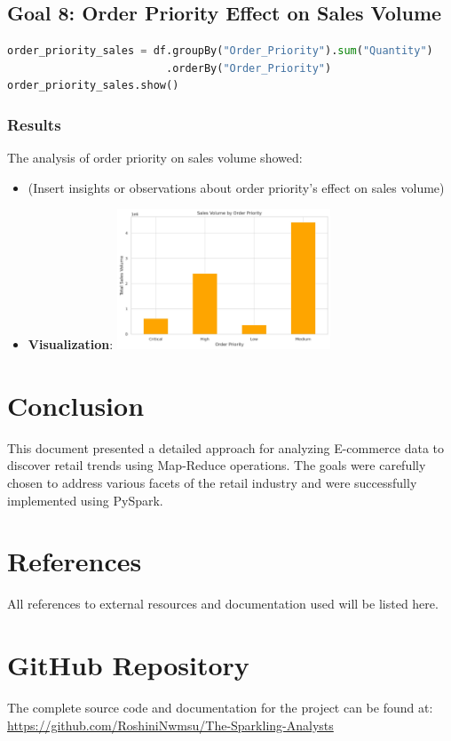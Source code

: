 \documentclass{article}
\begin{document}
\subsection{Goal 8: Order Priority Effect on Sales Volume}
\begin{lstlisting}[language=Python, caption={Order priority and its effect on sales volume}]
order_priority_sales = df.groupBy("Order_Priority").sum("Quantity")
                         .orderBy("Order_Priority")
order_priority_sales.show()
\end{lstlisting}
\subsubsection{Results}
The analysis of order priority on sales volume showed:

\begin{itemize}
    \item (Insert insights or observations about order priority's effect on sales volume)
    \item \textbf{Visualization}: \includegraphics[width=0.5\textwidth]{goal8.jpeg}
\end{itemize}
\section{Conclusion}
This document presented a detailed approach for analyzing E-commerce data to discover retail trends using Map-Reduce operations. The goals were carefully chosen to address various facets of the retail industry and were successfully implemented using PySpark.

\section{References}
All references to external resources and documentation used will be listed here.

\section{GitHub Repository}
The complete source code and documentation for the project can be found at:
\href{https://github.com/RoshiniNwmsu/The-Sparkling-Analysts}{https://github.com/RoshiniNwmsu/The-Sparkling-Analysts}
\end{document}

